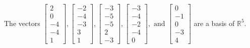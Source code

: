 \begin{exercise}
\begin{exerciseStatement}
  \end{exerciseStatement}
  \begin{exerciseAnswer}
   The vectors \(\left[\begin{array}{r}
2 \\
0 \\
-4 \\
-4 \\
1
\end{array}\right] , \left[\begin{array}{r}
-2 \\
-4 \\
-3 \\
3 \\
1
\end{array}\right] , \left[\begin{array}{r}
-3 \\
-5 \\
-5 \\
2 \\
-3
\end{array}\right] , \left[\begin{array}{r}
-3 \\
-4 \\
-2 \\
-4 \\
0
\end{array}\right] , \text{ and } \left[\begin{array}{r}
0 \\
-1 \\
0 \\
-3 \\
4
\end{array}\right]\) 
  	 are  a basis of \(\mathbb{R}^5\).
  


  \end{exerciseAnswer}
\end{exercise}